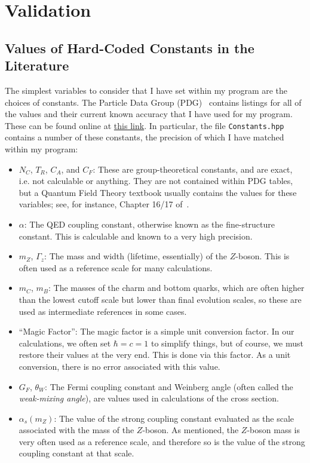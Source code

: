 \section{Validation}


\subsection{Values of Hard-Coded Constants in the Literature}

The simplest variables to consider that I have set within my program are the choices of constants. The Particle Data Group (PDG)~\cite{PDG} contains listings for all of the values and their current known accuracy that I have used for my program. These can be found online at \href{https://pdg.lbl.gov/}{this link}. In particular, the file \texttt{Constants.hpp} contains a number of these constants, the precision of which I have matched within my program:

\begin{itemize}
\item $N_C$, $T_R$, $C_A$, and $C_F$: These are group-theoretical constants, and are exact, i.e. not calculable or anything. They are not contained within PDG tables, but a Quantum Field Theory textbook usually contains the values for these variables; see, for instance, Chapter 16/17 of~\cite{peskin-schroeder}.
\item $\alpha$: The QED coupling constant, otherwise known as the fine-structure constant. This is calculable and known to a very high precision.
\item $m_Z$, $\Gamma_z$: The mass and width (lifetime, essentially) of the $Z$-boson. This is often used as a reference scale for many calculations.
\item $m_C$, $m_B$: The masses of the charm and bottom quarks, which are often higher than the lowest cutoff scale but lower than final evolution scales, so these are used as intermediate references in some cases.
\item ``Magic Factor'': The magic factor is a simple unit conversion factor. In our calculations, we often set $\hbar=c=1$ to simplify things, but of course, we must restore their values at the very end. This is done via this factor. As a unit conversion, there is no error associated with this value.
\item $G_F$, $\theta_W$: The Fermi coupling constant and Weinberg angle (often called the \textit{weak-mixing angle}), are values used in calculations of the cross section.
\item $\alpha_s(m_Z)$: The value of the strong coupling constant evaluated as the scale associated with the mass of the $Z$-boson. As mentioned, the $Z$-boson mass is very often used as a reference scale, and therefore so is the value of the strong coupling constant at that scale.
\end{itemize}

